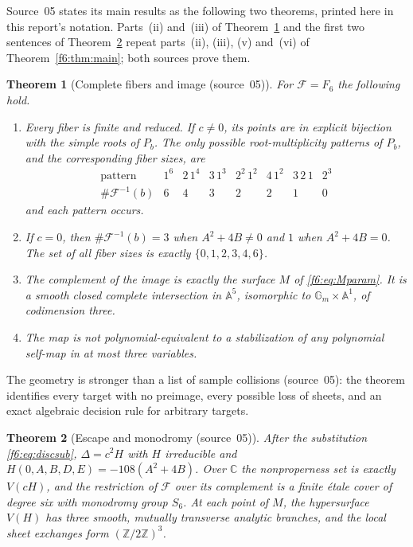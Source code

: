 \documentclass[11pt,a4paper]{article}
\newtheorem{theorem}{Theorem}[section]
\theoremstyle{definition}
\newcommand{\A}{\mathbb A}
\newcommand{\C}{\mathbb C}
\newcommand{\Z}{\mathbb Z}
\newcommand{\Gm}{\mathbb G_m}
\newcommand{\F}{\mathcal F}
\newcommand{\src}[1]{\textup{(source~#1)}}
\begin{document}
Source~05 states its main results as the following two theorems, printed
here in this report's notation. Parts~(ii) and~(iii) of
Theorem~\ref{f6:kf:thm:main} and the first two sentences of
Theorem~\ref{f6:kf:thm:geometry-summary} repeat parts~(ii), (iii), (v)
and~(vi) of Theorem~\ref{f6:thm:main}; both sources prove them.

\begin{theorem}[Complete fibers and image \src{05}]\label{f6:kf:thm:main}
For $\F=F_6$ the following hold.
\begin{enumerate}[label=\textup{(\roman*)}]
\item Every fiber is finite and reduced. If $c\ne0$, its points are in
explicit bijection with the simple roots of $P_b$. The only possible
root-multiplicity patterns of $P_b$, and the corresponding fiber sizes, are
\[
\begin{array}{c|ccccccc}
\text{pattern}&1^6&2\,1^4&3\,1^3&2^2\,1^2&4\,1^2&3\,2\,1&2^3\\ \hline
\#\F^{-1}(b)&6&4&3&2&2&1&0
\end{array}
\]
and each pattern occurs.
\item If $c=0$, then $\#\F^{-1}(b)=3$ when $A^2+4B\ne0$ and $1$ when
$A^2+4B=0$. The set of all fiber sizes is exactly $\{0,1,2,3,4,6\}$.
\item The complement of the image is exactly the surface $M$ of
\eqref{f6:eq:Mparam}. It is a smooth closed complete intersection in $\A^5$,
isomorphic to $\Gm\times\A^1$, of codimension three.
\item The map is not polynomial-equivalent to a stabilization of any
polynomial self-map in at most three variables.
\end{enumerate}
\end{theorem}

The geometry is stronger than a list of sample collisions \src{05}: the theorem
identifies every target with no preimage, every possible loss of sheets, and
an exact algebraic decision rule for arbitrary targets.

\begin{theorem}[Escape and monodromy \src{05}]\label{f6:kf:thm:geometry-summary}
After the substitution \eqref{f6:eq:discsub}, $\Delta=c^2H$ with $H$
irreducible and $H(0,A,B,D,E)=-108(A^2+4B)$. Over $\C$ the nonproperness set
is exactly $V(cH)$, and the restriction of $\F$ over its complement is a
finite \'etale cover of degree six with monodromy group $S_6$. At each point
of $M$, the hypersurface $V(H)$ has three smooth, mutually transverse
analytic branches, and the local sheet exchanges form $(\Z/2\Z)^3$.
\end{theorem}
\end{document}
